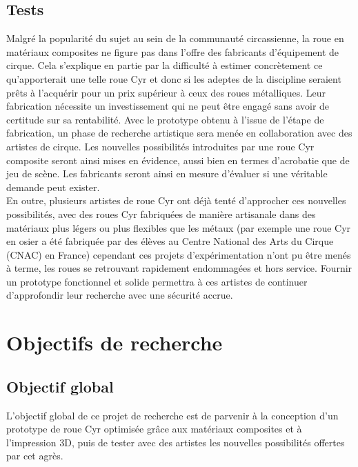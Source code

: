 \subsection{Tests}
Malgré la popularité du sujet au sein de la communauté circassienne, la roue en matériaux composites ne figure pas dans l'offre des fabricants d’équipement de cirque. Cela s'explique en partie par la difficulté à estimer concrètement ce qu’apporterait une telle roue Cyr et donc si les adeptes de la discipline seraient prêts à l'acquérir pour un prix supérieur à ceux des roues métalliques. Leur fabrication nécessite un investissement qui ne peut être engagé sans avoir de certitude sur sa rentabilité. Avec le prototype obtenu à l'issue de l'étape de fabrication, un phase de recherche artistique sera menée en collaboration avec des artistes de cirque. Les nouvelles possibilités introduites par une roue Cyr composite seront ainsi mises en évidence, aussi bien en termes d'acrobatie que de jeu de scène. Les fabricants seront ainsi en mesure d'évaluer si une véritable demande peut exister.\\
En outre, plusieurs artistes de roue Cyr ont déjà tenté d'approcher ces nouvelles possibilités, avec des roues Cyr fabriquées de manière artisanale dans des matériaux plus légers ou plus flexibles que les métaux (par exemple une roue Cyr en osier a été fabriquée par des élèves au Centre National des Arts du Cirque (CNAC) en France)
cependant ces projets d'expérimentation n'ont pu être menés à terme, les roues se retrouvant rapidement endommagées et hors service. Fournir un prototype fonctionnel et solide permettra à ces artistes de continuer d'approfondir leur recherche avec une sécurité accrue.

\FloatBarrier


\section{Objectifs de recherche}  %
\subsection{Objectif global}
L'objectif global de ce projet de recherche est de parvenir à la conception d’un prototype de roue Cyr optimisée grâce aux matériaux composites et à l'impression 3D, puis de tester avec des artistes les nouvelles possibilités offertes par cet agrès.

